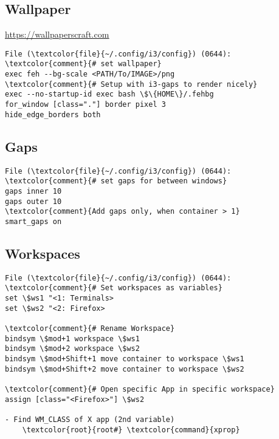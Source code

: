 \documentclass[10pt, a4paper, onecolumn, openany]{book}         %
\begin{document}
\subsection{Wallpaper}
\underline{\url{https://wallpaperscraft.com}}\newline
\begin{Verbatim}[commandchars=\\\{\}]
File (\textcolor{file}{~/.config/i3/config}) (0644):
\textcolor{comment}{# set wallpaper}
exec feh --bg-scale <PATH/To/IMAGE>/png
\textcolor{comment}{# Setup with i3-gaps to render nicely}
exec --no-startup-id exec bash \$\{HOME\}/.fehbg
for_window [class="."] border pixel 3
hide_edge_borders both
\end{Verbatim}


\subsection{Gaps}
\begin{Verbatim}[commandchars=\\\{\}]
File (\textcolor{file}{~/.config/i3/config}) (0644):
\textcolor{comment}{# set gaps for between windows}
gaps inner 10
gaps outer 10
\textcolor{comment}{Add gaps only, when container > 1}
smart_gaps on
\end{Verbatim}

\subsection{Workspaces}
\begin{Verbatim}[commandchars=\\\{\}]
File (\textcolor{file}{~/.config/i3/config}) (0644):
\textcolor{comment}{# Set workspaces as variables}
set \$ws1 "<1: Terminals>
set \$ws2 "<2: Firefox>

\textcolor{comment}{# Rename Workspace}
bindsym \$mod+1 workspace \$ws1
bindsym \$mod+2 workspace \$ws2
bindsym \$mod+Shift+1 move container to workspace \$ws1
bindsym \$mod+Shift+2 move container to workspace \$ws2

\textcolor{comment}{# Open specific App in specific workspace}
assign [class="<Firefox>"] \$ws2

- Find WM_CLASS of X app (2nd variable)
    \textcolor{root}{root#} \textcolor{command}{xprop}
\end{Verbatim}
\end{document}
